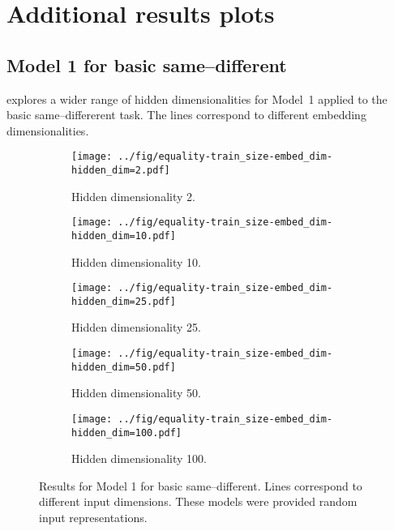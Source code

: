 \section{Additional results plots}


\subsection{Model 1 for basic same--different}\label{app:model1-results}

 explores a wider range of hidden dimensionalities for Model~1 applied to the basic same--differerent task. The lines correspond to different embedding dimensionalities.

\begin{figure}[H]
  \centering

  \begin{subfigure}{0.45\linewidth}
    \texttt{[image: ../fig/equality-train\_size-embed\_dim-hidden\_dim=2.pdf]}
    \caption{Hidden dimensionality 2.}
  \end{subfigure}
  \hfill
  \begin{subfigure}{0.45\linewidth}
    \texttt{[image: ../fig/equality-train\_size-embed\_dim-hidden\_dim=10.pdf]}
    \caption{Hidden dimensionality 10.}
  \end{subfigure}

  \vspace{24pt}

  \begin{subfigure}{0.45\linewidth}
    \texttt{[image: ../fig/equality-train\_size-embed\_dim-hidden\_dim=25.pdf]}
    \caption{Hidden dimensionality 25.}
  \end{subfigure}
  \hfill
  \begin{subfigure}{0.45\linewidth}
    \texttt{[image: ../fig/equality-train\_size-embed\_dim-hidden\_dim=50.pdf]}
    \caption{Hidden dimensionality 50.}
  \end{subfigure}

  \vspace{24pt}

  \begin{subfigure}{0.45\linewidth}
    \texttt{[image: ../fig/equality-train\_size-embed\_dim-hidden\_dim=100.pdf]}
    \caption{Hidden dimensionality 100.}
    \label{fig:model1-rep}
  \end{subfigure}
  \caption{Results for Model 1 for basic same--different. Lines correspond to different input dimensions. These models were provided random input representations.}
  \label{fig:model1}
\end{figure}




